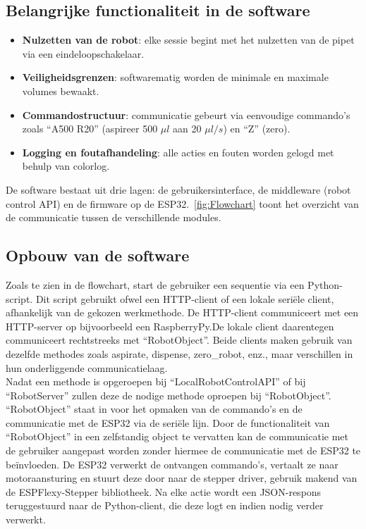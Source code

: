 \subsection{Belangrijke functionaliteit in de software}
\begin{itemize}
    \item \textbf{Nulzetten van de robot}: elke sessie begint met het nulzetten van de pipet via een eindeloopschakelaar.
    \item \textbf{Veiligheidsgrenzen}: softwarematig worden de minimale en maximale volumes bewaakt.
    \item \textbf{Commandostructuur}: communicatie gebeurt via eenvoudige commando’s zoals ``A500 R20'' (aspireer 500 $\mu l$ aan 20 $\mu l/s$) en ``Z'' (zero).
    \item \textbf{Logging en foutafhandeling}: alle acties en fouten worden gelogd met behulp van colorlog.
\end{itemize}
De software bestaat uit drie lagen: de gebruikersinterface, de middleware (robot control API) en de firmware op de ESP32.\ \autoref{fig:Flowchart} toont het overzicht van de communicatie tussen de verschillende modules.

\subsection{Opbouw van de software}

Zoals te zien in de flowchart, start de gebruiker een sequentie via een Python-script. Dit script gebruikt ofwel een HTTP-client of een lokale seriële client, afhankelijk van de gekozen werkmethode.
De HTTP-client communiceert met een HTTP-server op bijvoorbeeld een RaspberryPy.\@ De lokale client daarentegen communiceert rechtstreeks met ``RobotObject''.
Beide clients maken gebruik van dezelfde methodes zoals aspirate, dispense, zero\_robot, enz., maar verschillen in hun onderliggende communicatielaag.
\\[12pt]Nadat een methode is opgeroepen bij ``LocalRobotControlAPI'' of bij ``RobotServer'' zullen deze de nodige methode oproepen bij ``RobotObject''. ``RobotObject'' staat in voor het opmaken van de commando's en de communicatie met de ESP32 via de seriële lijn.
Door de functionaliteit van ``RobotObject'' in een zelfstandig object te vervatten kan de communicatie met de gebruiker aangepast worden zonder hiermee de communicatie met de ESP32 te beïnvloeden.
De ESP32 verwerkt de ontvangen commando’s, vertaalt ze naar motoraansturing en stuurt deze door naar de stepper driver, gebruik makend van de ESPFlexy-Stepper bibliotheek. Na elke actie wordt een JSON-respons teruggestuurd naar de Python-client, die deze logt en indien nodig verder verwerkt.


